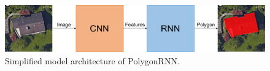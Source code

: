 \begin{figure}[!h]
	\centering
	\includegraphics[width=\fig\textwidth]{3-00.pdf}
    \caption[Simplified model architecture of PolygonRNN]{Simplified model architecture of PolygonRNN.}
    \label{fig:simppoly}
\end{figure}